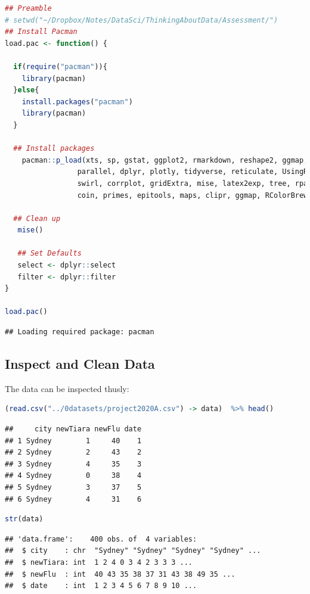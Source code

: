 \documentclass{article}
\begin{document}
\begin{lstlisting}[language=R]
## Preamble
# setwd("~/Dropbox/Notes/DataSci/ThinkingAboutData/Assessment/")
## Install Pacman
load.pac <- function() {

  if(require("pacman")){
    library(pacman)
  }else{
    install.packages("pacman")
    library(pacman)
  }
  
  ## Install packages
    pacman::p_load(xts, sp, gstat, ggplot2, rmarkdown, reshape2, ggmap,
                 parallel, dplyr, plotly, tidyverse, reticulate, UsingR, Rmpfr,
                 swirl, corrplot, gridExtra, mise, latex2exp, tree, rpart, lattice,
                 coin, primes, epitools, maps, clipr, ggmap, RColorBrewer, latex2exp)
  
  ## Clean up
   mise()
   
   ## Set Defaults
   select <- dplyr::select
   filter <- dplyr::filter
}

load.pac()
\end{lstlisting}

\begin{lstlisting}
## Loading required package: pacman
\end{lstlisting}



\hypertarget{inspect-and-clean-data}{%
\subsection{Inspect and Clean Data}\label{inspect-and-clean-data}}

The data can be inspected thusly:

\begin{lstlisting}[language=R]
(read.csv("../0datasets/project2020A.csv") -> data)  %>% head()
\end{lstlisting}

\begin{lstlisting}
##     city newTiara newFlu date
## 1 Sydney        1     40    1
## 2 Sydney        2     43    2
## 3 Sydney        4     35    3
## 4 Sydney        0     38    4
## 5 Sydney        3     37    5
## 6 Sydney        4     31    6
\end{lstlisting}

\begin{lstlisting}[language=R]
str(data)
\end{lstlisting}

\begin{lstlisting}
## 'data.frame':    400 obs. of  4 variables:
##  $ city    : chr  "Sydney" "Sydney" "Sydney" "Sydney" ...
##  $ newTiara: int  1 2 4 0 3 4 2 3 3 3 ...
##  $ newFlu  : int  40 43 35 38 37 31 43 38 49 35 ...
##  $ date    : int  1 2 3 4 5 6 7 8 9 10 ...
\end{lstlisting}
\end{document}
